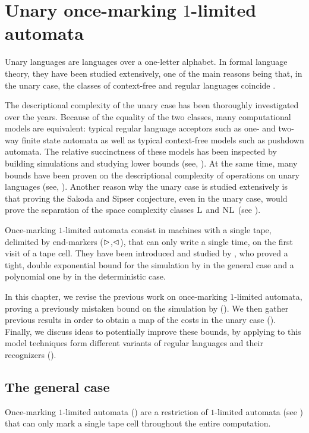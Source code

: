 \chapter{Unary once-marking \texorpdfstring{$1$}{1}-limited automata}
Unary languages are languages over a one-letter alphabet.
In formal language theory, they have been studied extensively, one of the main reasons being that, in the unary case, the classes of context-free and regular languages coincide \cite{GinRic62}.

The descriptional complexity of the unary case has been thoroughly investigated over the years.
Because of the equality of the two classes, many computational models are equivalent: typical regular language acceptors such as one- and two-way finite state automata as well as typical context-free models such as pushdown automata.
The relative succinctness of these models has been inspected by building simulations and studying lower bounds (see, \eg[,] \cite{GefMer+03,MerPig01,Pig08,PigSha+02}).
At the same time, many bounds have been proven on the descriptional complexity of operations on unary languages (see, \eg[,] \cite{HolKut03,KunOkh12,MerPig05,PigSha02}).
Another reason why the unary case is studied extensively is that proving the Sakoda and Sipser conjecture, even in the unary case, would prove the separation of the space complexity classes $\textsc{L}$ and $\textsc{NL}$ (see ).

Once-marking $1$-limited automata consist in machines with a single tape, delimited by end-markers ($\rhd$,$\lhd$), that can only write a single time, on the first visit of a tape cell.
They have been introduced and studied by \citeauthor{PigPri23a}, who proved a tight, double exponential bound for the simulation by \ODFAs in the general case and a polynomial one by \TDFA in the deterministic case.

In this chapter, we revise the previous work on once-marking $1$-limited automata, proving a previously mistaken bound on the simulation by \ONFA ().
We then gather previous results in order to obtain a map of the costs in the unary case ().
Finally, we discuss ideas to potentially improve these bounds, by applying to this model techniques form different variants of regular languages and their recognizers ().



\section{The general case}\label{sec:oncemarking-general}
Once-marking $1$-limited automata (\OMOLA) are a restriction of $1$-limited automata (see ) that can only mark a single tape cell throughout the entire computation.

